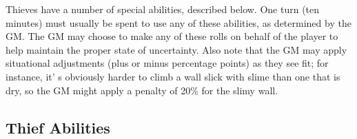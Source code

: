 \documentclass[a4paper,twoside,openany,10pt]{book}
\begin{document}
\begin{multicols}{2}
Thieves have a number of special abilities, described below. One turn (ten minutes) must usually be spent to use any of these abilities, as determined by the GM. The GM may choose to make any of these rolls on behalf of the player to help maintain the proper state of uncertainty. Also note that the GM may apply situational adjustments (plus or minus percentage points) as they see fit; for instance, it' s obviously harder to climb a wall slick with slime than one that is dry, so the GM might apply a penalty of 20\% for the slimy wall.


\end{multicols}

\pagebreak

\subsection{Thief Abilities}\label{thief-abilities}
\end{document}
